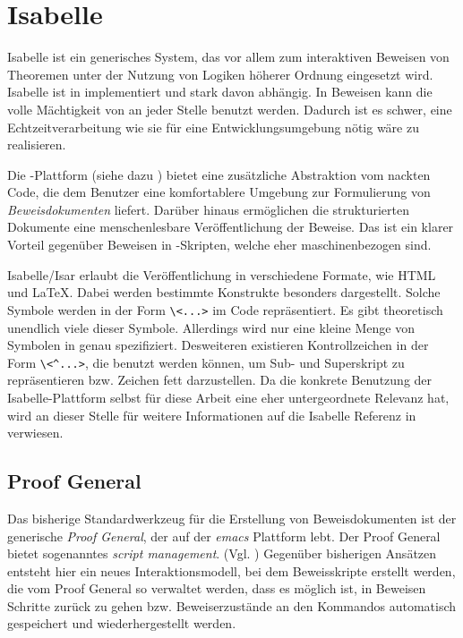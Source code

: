 \section{Isabelle}

Isabelle ist ein generisches System, das vor allem zum interaktiven Beweisen von Theoremen unter
der Nutzung von Logiken höherer Ordnung eingesetzt wird. Isabelle ist in  implementiert und
stark davon abhängig. In Beweisen kann die volle Mächtigkeit von  an jeder Stelle benutzt
werden. Dadurch ist es schwer, eine Echtzeitverarbeitung wie sie für eine Entwicklungsumgebung nötig
wäre zu realisieren.

Die -Plattform (siehe dazu \cite{isar}) bietet eine zusätzliche Abstraktion vom nackten
 Code, die dem Benutzer eine komfortablere Umgebung zur Formulierung von
\textit{Beweisdokumenten} liefert. Darüber hinaus ermöglichen die strukturierten Dokumente eine
menschenlesbare Veröffentlichung der Beweise. Das ist ein klarer Vorteil gegenüber Beweisen in
-Skripten, welche eher maschinenbezogen sind.

Isabelle/Isar erlaubt die Veröffentlichung in verschiedene Formate, wie HTML und \LaTeX. Dabei werden
bestimmte Konstrukte besonders dargestellt. Solche Symbole werden in der Form
\texttt{\textbackslash\textless ...\textgreater} im Code repräsentiert. Es gibt theoretisch
unendlich viele dieser Symbole. Allerdings wird nur eine kleine Menge von Symbolen in
\cite[S. 265-270]{isabelle} genau spezifiziert. Desweiteren existieren Kontrollzeichen in der Form
\texttt{\textbackslash\textless\textasciicircum ...\textgreater}, die benutzt werden können, um
Sub- und Superskript zu repräsentieren bzw. Zeichen fett darzustellen. Da die konkrete Benutzung der
Isabelle-Plattform selbst für diese Arbeit eine eher untergeordnete Relevanz hat, wird an dieser
Stelle für weitere Informationen auf die Isabelle Referenz in \cite{isabelle} verwiesen.

\subsection{Proof General}

Das bisherige Standardwerkzeug für die Erstellung von Beweisdokumenten ist der generische
\textit{Proof General}, der auf der \textit{emacs} Plattform lebt. Der Proof General bietet
sogenanntes \textit{script management}. (Vgl. \cite[S. 161-194]{sm}) Gegenüber bisherigen Ansätzen
entsteht hier ein neues Interaktionsmodell, bei dem Beweisskripte erstellt werden, die vom Proof
General so verwaltet werden, dass es möglich ist, in Beweisen Schritte zurück zu gehen bzw.
Beweiserzustände an den Kommandos automatisch gespeichert und wiederhergestellt werden.

